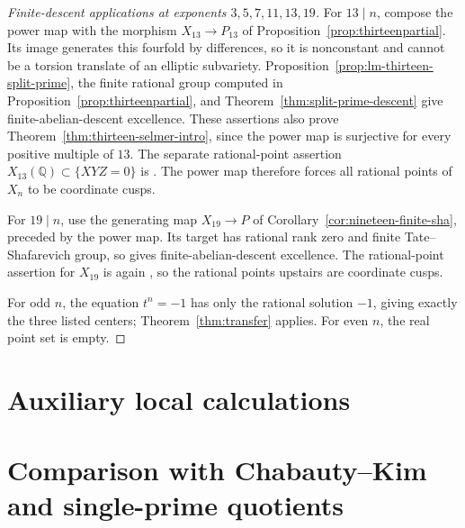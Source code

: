 \documentclass[11pt]{article}
\newcommand{\Q}{\mathbb Q}
\numberwithin{equation}{section}
\theoremstyle{definition}
\begin{document}
\begin{proof}[Finite-descent applications at exponents \(3,5,7,11,13,19\)]
For $13\mid n$, compose the power map with the morphism
$X_{13}\to P_{13}$ of Proposition~\ref{prop:thirteenpartial}.
Its image generates this fourfold by differences, so it is nonconstant
and cannot be a torsion translate of an elliptic subvariety.
Proposition~\ref{prop:lm-thirteen-split-prime}, the finite rational
group computed in Proposition~\ref{prop:thirteenpartial}, and
Theorem~\ref{thm:split-prime-descent} give finite-abelian-descent
excellence. These assertions also prove
Theorem~\ref{thm:thirteen-selmer-intro}, since the power map is
surjective for every positive multiple of $13$.
The separate rational-point assertion
$X_{13}(\Q)\subset\{XYZ=0\}$ is
\citet[Theorem~0.5, p.~448]{Wiles1995}. The power map therefore forces
all rational points of $X_n$ to be coordinate cusps.

For $19\mid n$, use the generating map $X_{19}\to P$ of
Corollary~\ref{cor:nineteen-finite-sha}, preceded by the power map.
Its target has rational rank zero and finite Tate--Shafarevich group,
so \citet[Theorem~8.6, p.~385]{Stoll2007} gives
finite-abelian-descent excellence. The rational-point assertion
for $X_{19}$ is again \citet[Theorem~0.5, p.~448]{Wiles1995}, so the
rational points upstairs are coordinate cusps.

For odd $n$, the equation $t^n=-1$ has only the rational solution
$-1$, giving exactly the three listed centers; Theorem~\ref{thm:transfer}
applies. For even $n$, the real point set is empty.
\end{proof}




















\section{Auxiliary local calculations}



\section{Comparison with Chabauty--Kim and single-prime quotients}
\end{document}
